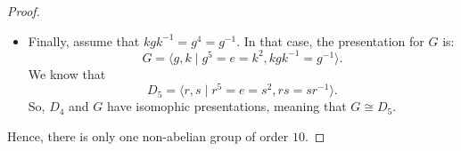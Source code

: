 \documentclass[a4paper, openany]{memoir}
\theoremstyle{definition}
\theoremstyle{plain}
\begin{document}
\begin{proof}
\begin{itemize}
            \item Finally, assume that $kgk^{-1} = g^4 = g^{-1}$. In that case, the presentation for $G$ is:
            \[G = \langle g, k \mid g^5 = e = k^2, kgk^{-1} = g^{-1}\rangle.\]
            We know that
            \[D_5 = \langle r, s \mid r^5 = e = s^2, rs = sr^{-1} \rangle.\]
            So, $D_4$ and $G$ have isomophic presentations, meaning that $G \cong D_5$.
        \end{itemize}
        Hence, there is only one non-abelian group of order $10$.
    \end{proof}
\end{document}
